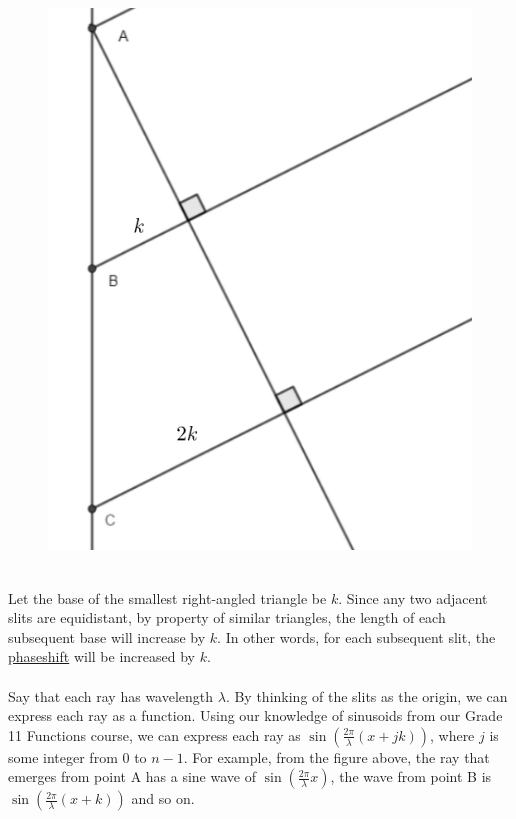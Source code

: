 \documentclass[12pt]{article}
\begin{document}
\begin{figure}[h!]
  \centering
  \includegraphics[scale=0.5]{figure_dos.png}
\end{figure}
\\Let the base of the smallest right-angled triangle be $k$. Since any two adjacent slits are equidistant, by property of similar triangles, the length of each subsequent base will
increase by $k$. In other words, for each subsequent slit, the \underline{phaseshift} will be increased by $k$.
\\
\\
Say that each ray has wavelength $\lambda$. By thinking of the slits as the origin, we can express each ray as a function.
Using our knowledge of sinusoids from our Grade 11 Functions course, we can express each ray as $\sin(\frac{2\pi}{\lambda}(x+jk))$, where $j$ is some integer from $0$ to $n-1$. 
For example, from the figure above, the ray that emerges from point A has a sine wave of $\sin(\frac{2\pi}{\lambda}x)$, the wave from point B is $\sin(\frac{2\pi}{\lambda}(x+k))$ and so on. 
\end{document}

